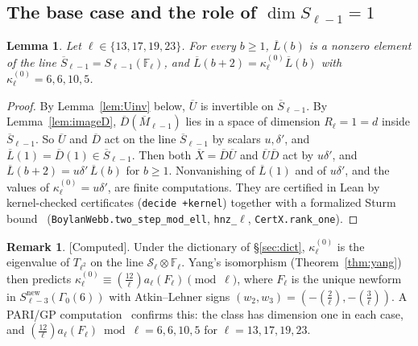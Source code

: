\documentclass[11pt]{amsart}
\newcommand{\Fl}{\mathbb{F}_\ell}
\newcommand{\Sb}{\overline{S}}
\newcommand{\Mb}{\overline{M}}
\newcommand{\Ub}{\overline{U}}
\newcommand{\Db}{\overline{D}}
\newcommand{\Xb}{\overline{X}}
\newcommand{\Lb}{\overline{L}}
\newcommand{\cS}{\mathcal{S}}
\newcommand{\leg}[2]{\left(\frac{#1}{#2}\right)}
\newcommand{\st}[1]{\textup{\textsf{[#1]}}}
\newcommand{\lean}[1]{\texttt{#1}}
\theoremstyle{plain}
\newtheorem{lemma}[theorem]{Lemma}
\theoremstyle{definition}
\newtheorem{remark}[theorem]{Remark}
\numberwithin{equation}{section}
\begin{document}
\subsection{The base case and the role of $\dim S_{\ell-1}=1$}\label{sec:base}
\begin{lemma}\label{lem:base}
Let $\ell\in\{13,17,19,23\}$. For every $b\ge1$, $\Lb(b)$ is a nonzero element of the line $\Sb_{\ell-1}=S_{\ell-1}(\Fl)$, and
$\Lb(b+2)=\kappa^{(0)}_\ell\Lb(b)$ with $\kappa^{(0)}_\ell=6,6,10,5$.
\end{lemma}
\begin{proof}
By Lemma~\ref{lem:Uinv} below, $\Ub$ is invertible on $\Sb_{\ell-1}$. By Lemma~\ref{lem:imageD}, $\Db(\Mb_{\ell-1})$ lies in a
space of dimension $R_\ell=1=d$ inside $\Sb_{\ell-1}$. So $\Ub$ and $\Db$ act on the line $\Sb_{\ell-1}$ by scalars $u,\delta'$, and
$\Lb(1)=\Db(1)\in\Sb_{\ell-1}$. Then both $\Xb=\Db\Ub$ and $\Ub\Db$ act by $u\delta'$, and $\Lb(b+2)=u\delta'\,\Lb(b)$ for $b\ge1$.
Nonvanishing of $\Lb(1)$ and of $u\delta'$, and the values of $\kappa^{(0)}_\ell=u\delta'$, are finite computations. They are
certified in Lean by kernel-checked certificates (\lean{decide +kernel}) together with a formalized Sturm
bound~\cite{Sturm1987} (\lean{BoylanWebb.two\_step\_mod\_ell}, \lean{hnz\_\ensuremath{\ell}}, \lean{CertX.rank\_one}).
\end{proof}

\begin{remark}\label{rem:kappa-yang}
\st{Computed}. Under the dictionary of \S\ref{sec:dict}, $\kappa^{(0)}_\ell$ is the eigenvalue of $T_{\ell^2}$ on the line
$\cS_\ell\otimes\Fl$. Yang's isomorphism (Theorem~\ref{thm:yang}) then predicts
$\kappa^{(0)}_\ell\equiv\leg{12}{\ell}a_\ell(F_\ell)\pmod\ell$, where $F_\ell$ is the unique newform in
$S^{\mathrm{new}}_{\ell-3}(\Gamma_0(6))$ with Atkin--Lehner signs $(w_2,w_3)=(-\leg{2}{\ell},-\leg{3}{\ell})$. A PARI/GP
computation~\cite{PARI} confirms this: the class has dimension one in each case, and
$\leg{12}{\ell}a_\ell(F_\ell)\bmod\ell=6,6,10,5$ for $\ell=13,17,19,23$.
\end{remark}
\end{document}
